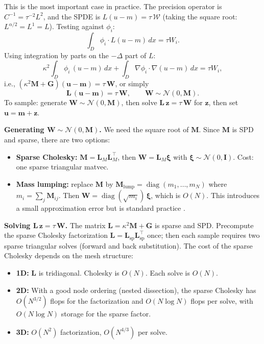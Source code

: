 \documentclass[11pt]{article}
\newcommand{\bM}{\mathbf{M}}
\newcommand{\bL}{\mathbf{L}}
\newcommand{\bu}{\mathbf{u}}
\newcommand{\bmm}{\mathbf{m}}
\newcommand{\bxi}{\boldsymbol{\xi}}
\DeclareMathOperator{\diag}{diag}
\begin{document}
This is the most important case in practice.  The precision operator is $C^{-1} = \tau^{-2} L^2$, and the SPDE is $L(u-m) = \tau\, \mathcal{W}$ (taking the square root: $L^{\alpha/2} = L^1 = L$).  Testing against $\phi_i$:
\[
  \int_D \phi_i \cdot L(u-m)\, dx = \tau W_i.
\]
Using integration by parts on the $-\Delta$ part of $L$:
\[
  \kappa^2 \int_D \phi_i\, (u-m)\, dx + \int_D \nabla\phi_i \cdot \nabla(u-m)\, dx = \tau W_i,
\]
i.e., $(\kappa^2 \bM + \mathbf{G})(\bu - \bmm) = \tau\, \mathbf{W}$, or simply
\begin{equation}\label{eq:alpha2_system}
  \bL\, (\bu - \bmm) = \tau\, \mathbf{W}, \qquad \mathbf{W} \sim \mathcal{N}(0, \bM).
\end{equation}
To sample: generate $\mathbf{W} \sim \mathcal{N}(0, \bM)$, then solve $\bL\, \mathbf{z} = \tau\, \mathbf{W}$ for $\mathbf{z}$, then set $\bu = \bmm + \mathbf{z}$.

\medskip\noindent\textbf{Generating $\mathbf{W} \sim \mathcal{N}(0, \bM)$.}  We need the square root of $\bM$.  Since $\bM$ is SPD and sparse, there are two options:
\begin{itemize}[nosep]
  \item \textbf{Sparse Cholesky:} $\bM = \bL_M \bL_M^\top$, then $\mathbf{W} = \bL_M \bxi$ with $\bxi \sim \mathcal{N}(0, \mathbf{I})$.  Cost: one sparse triangular matvec.
  \item \textbf{Mass lumping:} replace $\bM$ by $\bM_{\text{lump}} = \diag(m_1, \ldots, m_N)$ where $m_i = \sum_j \bM_{ij}$.  Then $\mathbf{W} = \diag(\sqrt{m_i})\, \bxi$, which is $O(N)$.  This introduces a small approximation error but is standard practice \cite{LindgrenRueLindstrom2011}.
\end{itemize}

\medskip\noindent\textbf{Solving $\bL\, \mathbf{z} = \tau\, \mathbf{W}$.}  The matrix $\bL = \kappa^2 \bM + \mathbf{G}$ is sparse and SPD.  Precompute the sparse Cholesky factorization $\bL = \bL_{\text{sp}} \bL_{\text{sp}}^\top$ once; then each sample requires two sparse triangular solves (forward and back substitution).  The cost of the sparse Cholesky depends on the mesh structure:
\begin{itemize}[nosep]
  \item \textbf{1D:} $\bL$ is tridiagonal.  Cholesky is $O(N)$.  Each solve is $O(N)$.
  \item \textbf{2D:} With a good node ordering (nested dissection), the sparse Cholesky has $O(N^{3/2})$ flops for the factorization and $O(N \log N)$ flops per solve, with $O(N \log N)$ storage for the sparse factor.
  \item \textbf{3D:} $O(N^2)$ factorization, $O(N^{4/3})$ per solve.
\end{itemize}
\end{document}
